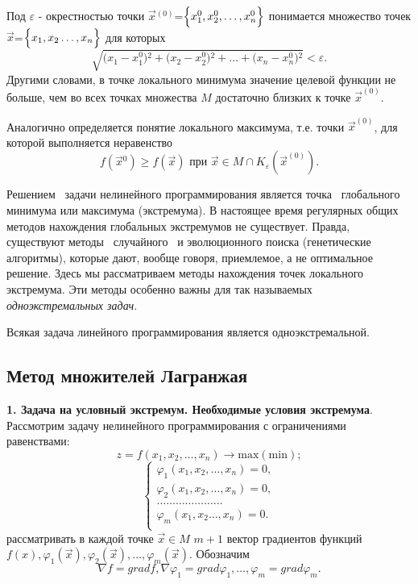 Под $\varepsilon$ - окрестностью точки $\vec x{}^{(0)}$=$\Bigl\{x_{1}^0,x_{2}^0,\dots,x_{n}^0\Bigr\} $ понимается множество точек $\vec x$=$\Bigl\{x_1,x_2\dots,x_n\Bigr\}$ для которых
\[\sqrt{\Biggl(x_1-x_1^{0}\Biggr){}^2+\Biggl(x_2-x_2^{0}\Biggr){}^2+\dots+\Biggl(x_n-x_n^{0}\Biggr){}^2}<\varepsilon.\]
\indent\indent Другими словами, в точке локального минимума значение целевой функции не больше, чем во всех точках множества $M$ достаточно близких к точке $\vec x^{(0)}$.

Аналогично определяется понятие локального максимума, т.е. точки $\vec x^{(0)}$, для которой выполняется неравенство
\[f(\vec x{}^{0})\geqslant f(\vec x) \text{ при } \vec x \in M\cap K_{\varepsilon}(\vec x^{(0)}).\]





Решением~ задачи нелинейного программирования является точка~ глобального~  минимума или максимума (экстремума). В настоящее время регулярных общих методов нахождения глобальных экстремумов не существует. Правда,~ существуют методы~  случайного~  и эволюционного поиска (генетические алгоритмы), которые дают, вообще говоря, приемлемое, а не оптимальное решение. Здесь мы рассматриваем методы нахождения точек локального экстремума. Эти методы особенно важны для так называемых \textit{одноэкстремальных задач}.




Всякая задача линейного программирования является одноэкстремальной.

\subsection{Метод множителей Лагранжая}
\indent\indent\textbf{1. Задача на условный экстремум. Необходимые условия экстремума}. Рассмотрим задачу нелинейного программирования с ограничениями равенствами:
\[z=f(x_1,x_2,\dots,x_n)\to\mathrm{max(min)};\]
\[
    \begin{cases}
        \varphi_1(x_1,x_2,\dots,x_n)=0,\\
        \varphi_2(x_1,x_2,\dots,x_n)=0,\\
        \dots\dots\dots\dots\dots\dots\dots\\
        \varphi_m(x_1,x_2\dots,x_n)=0.\\
    \end{cases}
\]
 рассматривать в каждой точке $\vec x \in M$  $m+1$ вектор градиентов функций $f(x),\varphi_1(\vec x),\varphi_2(\vec x),\dots,\varphi_m(\vec x)$. Обозначим
\[\nabla f = grad f,\nabla\varphi_1 = grad\varphi_1,\dots,\varphi_m = grad\varphi_m.\]


